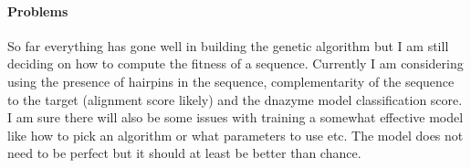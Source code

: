 \documentclass[11pt]{article}
\begin{document}
\paragraph{\textbf{Problems}}

So far everything has gone well in building the genetic algorithm but I am still deciding on how to compute the fitness of a sequence.
Currently I am considering using the presence of hairpins in the sequence, complementarity of the sequence to the target (alignment score likely) and the dnazyme model classification score.
I am sure there will also be some issues with training a somewhat effective model like how to pick an algorithm or what parameters to use etc.
The model does not need to be perfect but it should at least be better than chance.
\end{document}

